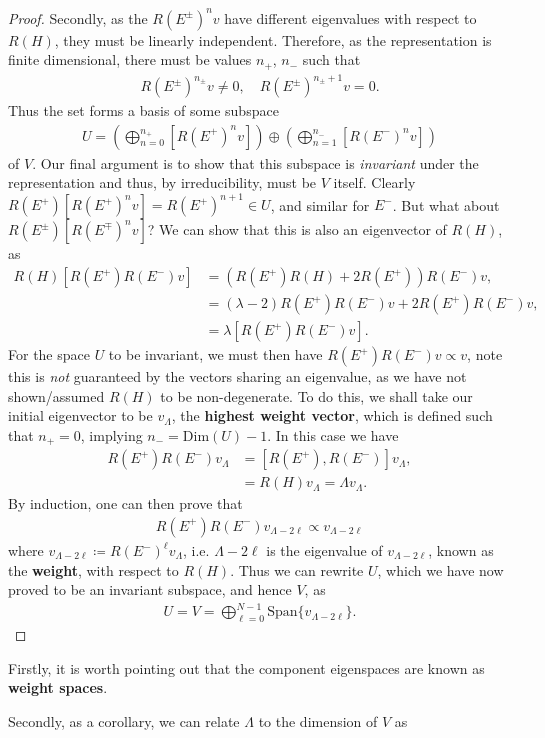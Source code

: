 \documentclass[11pt,fleqn]{article}
\begin{document}
\begin{proof}
	Secondly, as the $R(E^\pm)^n v$ have different eigenvalues with respect to $R(H)$, they must be linearly independent. Therefore, as the representation is finite dimensional, there must be values $n_+$, $n_-$ such that
		\begin{align}
			R(E^\pm)^{n_\pm} v \neq 0, \quad R(E^\pm)^{n_\pm + 1} v = 0.
		\end{align}
	Thus the set forms a basis of some subspace 
		\begin{align}
			U = \left( \bigoplus_{n=0}^{n_+} \left[ R(E^+)^n v \right] \right) \oplus \left( \bigoplus_{n=1}^{n_-} \left[ R(E^-)^n v \right] \right)
		\end{align}
	 of $V$. Our final argument is to show that this subspace is \textit{invariant} under the representation and thus, by irreducibility, must be $V$ itself. Clearly $R(E^+) \left[ R(E^+)^n v \right] = R(E^+)^{n+1} \in U$, and similar for $E^-$. But what about $R(E^\pm) \left[ R(E^\mp)^n v \right]$? We can show that this is also an eigenvector of $R(H)$, as
	 	\begin{align}
	 		R(H) \left[ R(E^+) R(E^-) v \right] 
	 		&= \left( R(E^+) R(H)  + 2 R(E^+) \right) R(E^-) v \nonumber ,\\
	 		&= (\lambda - 2) R(E^+)R(E^-) v + 2 R(E^+)R(E^-) v, \\
	 		&= \lambda \left[ R(E^+) R(E^-) v \right]. \nonumber
	 	\end{align}
	 For the space $U$ to be invariant, we must then have $R(E^+) R(E^-) v \propto v$, note this is \textit{not} guaranteed by the vectors sharing an eigenvalue, as we have not shown/assumed $R(H)$ to be non-degenerate. To do this, we shall take our initial eigenvector to be $v_\Lambda$, the \textbf{highest weight vector}, which is defined such that $n_+ = 0$, implying $n_- = \text{Dim}(U) - 1$. In this case we have
	 	\begin{align}
	 		R(E^+)R(E^-) v_\Lambda 
	 		&= [R(E^+),R(E^-)] v_\Lambda, \nonumber \\
	 		&= R(H) v_\Lambda = \Lambda v_\Lambda.
	 	\end{align}
	 By induction, one can then prove that 
	 	\begin{align}
	 		R(E^+)R(E^-) v_{\Lambda - 2\ell} \propto v_{\Lambda - 2\ell}
	 	\end{align}
	 where $v_{\Lambda - 2\ell} \coloneqq R(E^-)^\ell v_\Lambda$, i.e. $\Lambda - 2\ell$ is the eigenvalue of $v_{\Lambda - 2\ell}$, known as the \textbf{weight}, with respect to $R(H)$. Thus we can rewrite $U$, which we have now proved to be an invariant subspace, and hence $V$, as
	 	\begin{align}
	 		U = V = \bigoplus_{\ell = 0}^{N-1} \text{Span} \{ v_{\Lambda - 2\ell} \}.
	 	\end{align}
\end{proof}
\begin{remark}
	Firstly, it is worth pointing out that the component eigenspaces are known as \textbf{weight spaces}.
	
	Secondly, as a corollary, we can relate $\Lambda$ to the dimension of $V$ as
\end{remark}
\end{document}
